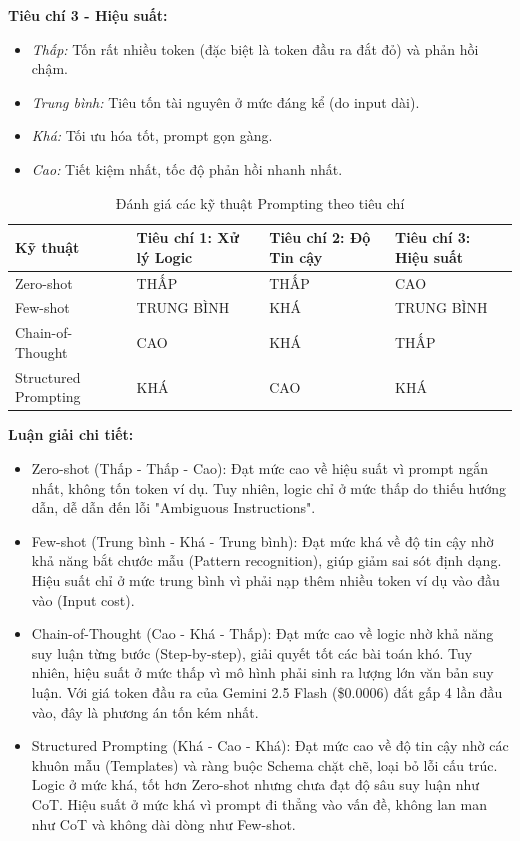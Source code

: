 \textbf{Tiêu chí 3 - Hiệu suất:}
\begin{itemize}
    \item \textit{Thấp:} Tốn rất nhiều token (đặc biệt là token đầu ra đắt đỏ) và phản hồi chậm.
    \item \textit{Trung bình:} Tiêu tốn tài nguyên ở mức đáng kể (do input dài).
    \item \textit{Khá:} Tối ưu hóa tốt, prompt gọn gàng.
    \item \textit{Cao:} Tiết kiệm nhất, tốc độ phản hồi nhanh nhất.
\end{itemize}

{\small
\begin{table}[htp]
\centering
\begin{tabular}{|p{4cm}|p{3.2cm}|p{3.2cm}|p{3.2cm}|}
\hline
\textbf{Kỹ thuật} & \textbf{Tiêu chí 1: Xử lý Logic} & \textbf{Tiêu chí 2: Độ Tin cậy} & \textbf{Tiêu chí 3: Hiệu suất} \\ \hline
Zero-shot & THẤP & THẤP & CAO \\ \hline
Few-shot & TRUNG BÌNH & KHÁ & TRUNG BÌNH \\ \hline
Chain-of-Thought & CAO & KHÁ & THẤP \\ \hline
Structured Prompting & KHÁ & CAO & KHÁ \\ \hline
\end{tabular}
\caption{Đánh giá các kỹ thuật Prompting theo tiêu chí}\label{tab:prompting-evaluation}
\end{table}
}
\textbf{Luận giải chi tiết:}
\begin{itemize}
    \item Zero-shot (Thấp - Thấp - Cao): Đạt mức cao về hiệu suất vì prompt ngắn nhất, không tốn token ví dụ. Tuy nhiên, logic chỉ ở mức thấp do thiếu hướng dẫn, dễ dẫn đến lỗi "Ambiguous Instructions".
    \item Few-shot (Trung bình - Khá - Trung bình): Đạt mức khá về độ tin cậy nhờ khả năng bắt chước mẫu (Pattern recognition), giúp giảm sai sót định dạng. Hiệu suất chỉ ở mức trung bình vì phải nạp thêm nhiều token ví dụ vào đầu vào (Input cost).
    \item Chain-of-Thought (Cao - Khá - Thấp): Đạt mức cao về logic nhờ khả năng suy luận từng bước (Step-by-step), giải quyết tốt các bài toán khó. Tuy nhiên, hiệu suất ở mức thấp vì mô hình phải sinh ra lượng lớn văn bản suy luận. Với giá token đầu ra của Gemini 2.5 Flash (\$0.0006) đắt gấp 4 lần đầu vào, đây là phương án tốn kém nhất.
    \item Structured Prompting (Khá - Cao - Khá): Đạt mức cao về độ tin cậy nhờ các khuôn mẫu (Templates) và ràng buộc Schema chặt chẽ, loại bỏ lỗi cấu trúc. Logic ở mức khá, tốt hơn Zero-shot nhưng chưa đạt độ sâu suy luận như CoT. Hiệu suất ở mức khá vì prompt đi thẳng vào vấn đề, không lan man như CoT và không dài dòng như Few-shot.
\end{itemize}


